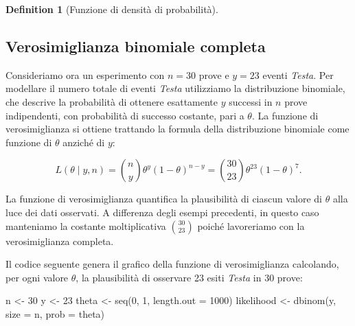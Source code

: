 \documentclass[
  letterpaper,
  DIV=11,
  numbers=noendperiod,
  oneside]{scrreprt}
\newenvironment{Shaded}{\begin{snugshade}}{\end{snugshade}}
\newcommand{\AttributeTok}[1]{\textcolor[rgb]{0.40,0.45,0.13}{#1}}
\newcommand{\DecValTok}[1]{\textcolor[rgb]{0.68,0.00,0.00}{#1}}
\newcommand{\FunctionTok}[1]{\textcolor[rgb]{0.28,0.35,0.67}{#1}}
\newcommand{\NormalTok}[1]{\textcolor[rgb]{0.00,0.23,0.31}{#1}}
\newcommand{\OtherTok}[1]{\textcolor[rgb]{0.00,0.23,0.31}{#1}}
\theoremstyle{definition}
\theoremstyle{plain}
\theoremstyle{definition}
\newtheorem{definition}{Definition}[chapter]
\theoremstyle{remark}
\begin{document}
\begin{definition}[Funzione di densità di
probabilità]
\subsection{Verosimiglianza binomiale
completa}\label{verosimiglianza-binomiale-completa}

Consideriamo ora un esperimento con \(n = 30\) prove e \(y = 23\) eventi
\emph{Testa}. Per modellare il numero totale di eventi \emph{Testa}
utilizziamo la distribuzione binomiale, che descrive la probabilità di
ottenere esattamente \(y\) successi in \(n\) prove indipendenti, con
probabilità di successo costante, pari a \(\theta\). La funzione di
verosimiglianza si ottiene trattando la formula della distribuzione
binomiale come funzione di \(\theta\) anziché di \(y\):

\[
L(\theta \mid y, n) = \binom{n}{y} \theta^y (1-\theta)^{n-y} = \binom{30}{23} \theta^{23} (1 - \theta)^7.
\]

La funzione di verosimiglianza quantifica la plausibilità di ciascun
valore di \(\theta\) alla luce dei dati osservati. A differenza degli
esempi precedenti, in questo caso manteniamo la costante moltiplicativa
\(\binom{30}{23}\) poiché lavoreriamo con la verosimiglianza completa.

Il codice seguente genera il grafico della funzione di verosimiglianza
calcolando, per ogni valore \(\theta\), la plausibilità di osservare 23
esiti \emph{Testa} in 30 prove:

\begin{Shaded}
\begin{Highlighting}[]
\NormalTok{n }\OtherTok{\textless{}{-}} \DecValTok{30}
\NormalTok{y }\OtherTok{\textless{}{-}} \DecValTok{23}
\NormalTok{theta }\OtherTok{\textless{}{-}} \FunctionTok{seq}\NormalTok{(}\DecValTok{0}\NormalTok{, }\DecValTok{1}\NormalTok{, }\AttributeTok{length.out =} \DecValTok{1000}\NormalTok{)}
\NormalTok{likelihood }\OtherTok{\textless{}{-}} \FunctionTok{dbinom}\NormalTok{(y, }\AttributeTok{size =}\NormalTok{ n, }\AttributeTok{prob =}\NormalTok{ theta)}


\end{Highlighting}
\end{Shaded}
\end{definition}
\end{document}
